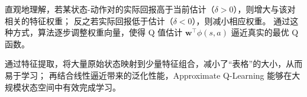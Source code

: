 直观地理解，若某状态-动作对的实际回报高于当前估计（$\delta > 0$），则增大与该对相关的特征权重；
反之若实际回报低于估计（$\delta < 0$），则减小相应权重。
通过这种方式，算法逐步调整权重向量，使得 Q 值估计 $\mathbf{w}^\top \phi(s,a)$ 逼近真实的最优 Q 函数。



通过特征提取，将大量原始状态映射到少量特征组合，减小了“表格”的大小，从而易于学习；
再结合线性逼近带来的泛化性能，Approximate Q-Learning 能够在大规模状态空间中有效完成学习。

